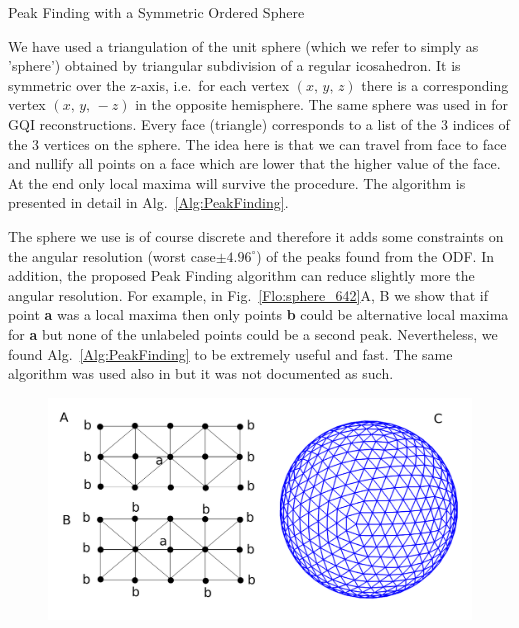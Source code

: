 \documentclass{bioinfo}
\begin{document}
\begin{methods}
\begin{algorithm}
\caption{Peak Finding with a Symmetric Ordered Sphere}

\label{Alg:PeakFinding}
\end{algorithm}


We have used a triangulation of the unit sphere (which we refer to
simply as 'sphere') obtained by triangular subdivision of a regular
icosahedron. It is symmetric over the z-axis, i.e.~for each vertex
$(x,\, y,\, z)$ there is a corresponding vertex $(x,\, y,\,-z)$
in the opposite hemisphere. The same sphere was used in \cite{Yeh2010}
for GQI reconstructions. Every face (triangle) corresponds to a list
of the $3$ indices of the $3$ vertices on the sphere. The idea here
is that we can travel from face to face and nullify all points on
a face which are lower that the higher value of the face. At the end
only local maxima will survive the procedure. The algorithm is presented
in detail in Alg.~\ref{Alg:PeakFinding}.

The sphere we use is of course discrete and therefore it adds some
constraints on the angular resolution (worst case$\pm4.96^{\circ}$)
of the peaks found from the ODF. In addition, the proposed Peak Finding
algorithm can reduce slightly more the angular resolution. For example,
in Fig.~\ref{Flo:sphere_642}A, B we show that if point \textbf{a}
was a local maxima then only points \textbf{b} could be alternative
local maxima for \textbf{a} but none of the unlabeled points could
be a second peak. Nevertheless, we found Alg.~\ref{Alg:PeakFinding}
to be extremely useful and fast. The same algorithm was used also
in \cite{Yeh2010} but it was not documented as such.

%
\begin{figure}
\begin{centering}
\includegraphics[scale=0.6]{figures/peak_finding_sphere}
\par\end{centering}


\end{figure}
\end{methods}
\end{document}
